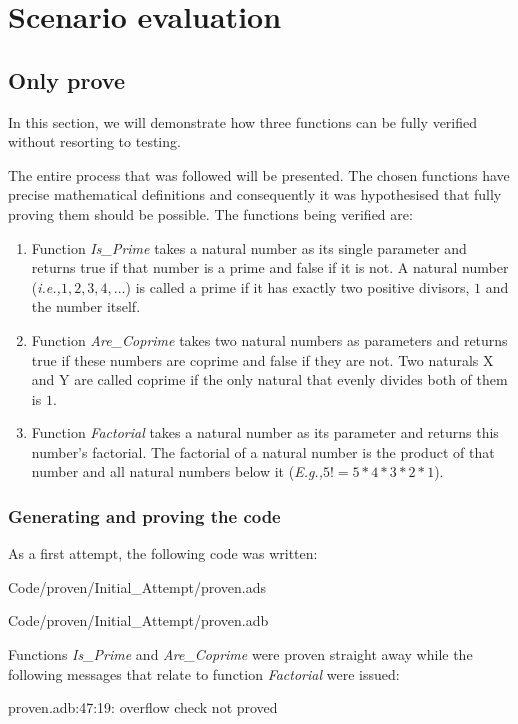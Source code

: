 \documentclass{llncs}
\newcommand{\ie}{\textit{i.e.,}\xspace}
\newcommand{\Eg}{\textit{E.g.,}\xspace}
\begin{document}
\section{Scenario evaluation}

\subsection{Only prove}
In this section, we will demonstrate how three functions can be fully
verified without resorting to testing.

The entire process that was followed will be presented. The chosen
functions have precise mathematical definitions and consequently it
was hypothesised that fully proving them should be possible. The
functions being verified are:
\begin{enumerate}
\item Function \emph{Is\_Prime} takes a natural number as its single
  parameter and returns true if that number is a prime and false if it
  is not. A natural number (\ie $1, 2, 3, 4, \dots$) is called a prime
  if it has exactly two positive divisors, $1$ and the number itself.
\item Function \emph{Are\_Coprime} takes two natural numbers as
  parameters and returns true if these numbers are coprime and false
  if they are not. Two naturals X and Y are called coprime if the only
  natural that evenly divides both of them is $1$.
\item Function \emph{Factorial} takes a natural number as its
  parameter and returns this number's factorial. The factorial of a
  natural number is the product of that number and all natural numbers
  below it (\Eg $5! = 5 * 4 * 3 * 2 * 1$).
\end{enumerate}

\subsubsection{Generating and proving the code}
As a first attempt, the following code was written:

{Code/proven/Initial_Attempt/proven.ads}

{Code/proven/Initial_Attempt/proven.adb}

Functions \emph{Is\_Prime} and \emph{Are\_Coprime} were proven
straight away while the following messages that relate to function
\emph{Factorial} were issued:

proven.adb:47:19: overflow check not proved
\end{document}
